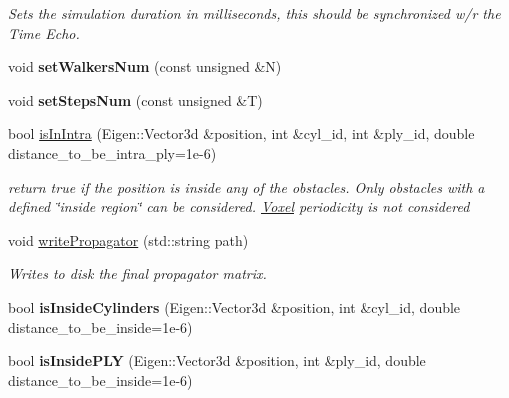 \begin{DoxyCompactItemize}
\begin{DoxyCompactList}\small\item\em Sets the simulation duration in milliseconds, this should be synchronized w/r the Time Echo. \end{DoxyCompactList}\item 
\mbox{\label{class_dynamics_simulation_a25b78b4ef659a448a806b995a19cf8b1}} 
void {\bfseries set\+Walkers\+Num} (const unsigned \&N)
\item 
\mbox{\label{class_dynamics_simulation_a45248ef6170eaf8a3a62b43f3ce77e02}} 
void {\bfseries set\+Steps\+Num} (const unsigned \&T)
\item 
bool \hyperlink{class_dynamics_simulation_ae7aa76c335aceb658a4ffc683898077c}{is\+In\+Intra} (Eigen\+::\+Vector3d \&position, int \&cyl\+\_\+id, int \&ply\+\_\+id, double distance\+\_\+to\+\_\+be\+\_\+intra\+\_\+ply=1e-\/6)
\begin{DoxyCompactList}\small\item\em return true if the position is inside any of the obstacles. Only obstacles with a defined \char`\"{}inside region\char`\"{} can be considered. \hyperlink{class_voxel}{Voxel} periodicity is not considered \end{DoxyCompactList}\item 
\mbox{\label{class_dynamics_simulation_aeae993217cebb5c23f68cb3e04cf8e49}} 
void \hyperlink{class_dynamics_simulation_aeae993217cebb5c23f68cb3e04cf8e49}{write\+Propagator} (std\+::string path)
\begin{DoxyCompactList}\small\item\em Writes to disk the final propagator matrix. \end{DoxyCompactList}\item 
\mbox{\label{class_dynamics_simulation_a6c69cd2599f088e7631be0721d5815f1}} 
bool {\bfseries is\+Inside\+Cylinders} (Eigen\+::\+Vector3d \&position, int \&cyl\+\_\+id, double distance\+\_\+to\+\_\+be\+\_\+inside=1e-\/6)
\item 
\mbox{\label{class_dynamics_simulation_a4064621288ca5066ed5b76cc71a81e25}} 
bool {\bfseries is\+Inside\+P\+LY} (Eigen\+::\+Vector3d \&position, int \&ply\+\_\+id, double distance\+\_\+to\+\_\+be\+\_\+inside=1e-\/6)
\end{DoxyCompactItemize}
